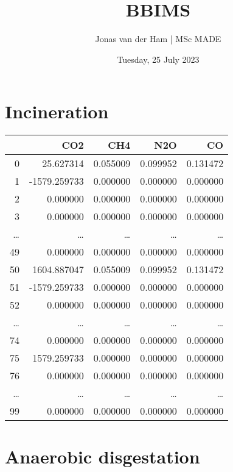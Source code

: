 \documentclass[logo, color, author]{article}
\author{Jonas van der Ham | MSc MADE}
\date{Tuesday, 25 July 2023}
\title{BBIMS}
\begin{document}
\maketitle
\section{Incineration}
\label{sec:org9057385}

\begin{center}
\begin{tabular}{rrrrr}
\hline
 & CO2 & CH4 & N2O & CO\\
\hline
0 & 25.627314 & 0.055009 & 0.099952 & 0.131472\\
1 & -1579.259733 & 0.000000 & 0.000000 & 0.000000\\
2 & 0.000000 & 0.000000 & 0.000000 & 0.000000\\
3 & 0.000000 & 0.000000 & 0.000000 & 0.000000\\
\ldots{} & \ldots{} & \ldots{} & \ldots{} & \ldots{}\\
49 & 0.000000 & 0.000000 & 0.000000 & 0.000000\\
50 & 1604.887047 & 0.055009 & 0.099952 & 0.131472\\
51 & -1579.259733 & 0.000000 & 0.000000 & 0.000000\\
52 & 0.000000 & 0.000000 & 0.000000 & 0.000000\\
\ldots{} & \ldots{} & \ldots{} & \ldots{} & \ldots{}\\
74 & 0.000000 & 0.000000 & 0.000000 & 0.000000\\
75 & 1579.259733 & 0.000000 & 0.000000 & 0.000000\\
76 & 0.000000 & 0.000000 & 0.000000 & 0.000000\\
\ldots{} & \ldots{} & \ldots{} & \ldots{} & \ldots{}\\
99 & 0.000000 & 0.000000 & 0.000000 & 0.000000\\
\hline
\end{tabular}
\end{center}


\section{Anaerobic disgestation}
\label{sec:org82b5812}
\end{document}
